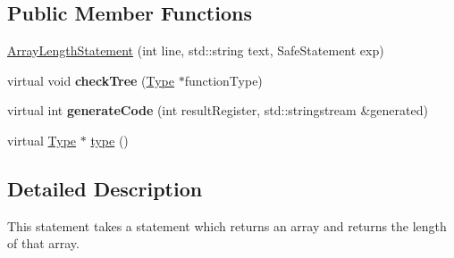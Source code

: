 \subsection*{Public Member Functions}
\begin{DoxyCompactItemize}
\item 
\hyperlink{class_array_length_statement_ae4b5d4f1b7b2c1437e3bc1c416498e58}{Array\-Length\-Statement} (int line, std\-::string text, Safe\-Statement exp)
\item 
\hypertarget{class_array_length_statement_a2cd373624cdf8a6b3628dd90ba0ff0b7}{virtual void {\bfseries check\-Tree} (\hyperlink{class_type}{Type} $\ast$function\-Type)}\label{class_array_length_statement_a2cd373624cdf8a6b3628dd90ba0ff0b7}

\item 
\hypertarget{class_array_length_statement_afeab6ae19e8f90fb3aaa108aa4d9faf6}{virtual int {\bfseries generate\-Code} (int result\-Register, std\-::stringstream \&generated)}\label{class_array_length_statement_afeab6ae19e8f90fb3aaa108aa4d9faf6}

\item 
virtual \hyperlink{class_type}{Type} $\ast$ \hyperlink{class_array_length_statement_ae9d1262af8041ac185d73d26111cce7c}{type} ()
\end{DoxyCompactItemize}


\subsection{Detailed Description}
This statement takes a statement which returns an array and returns the length of that array. 

